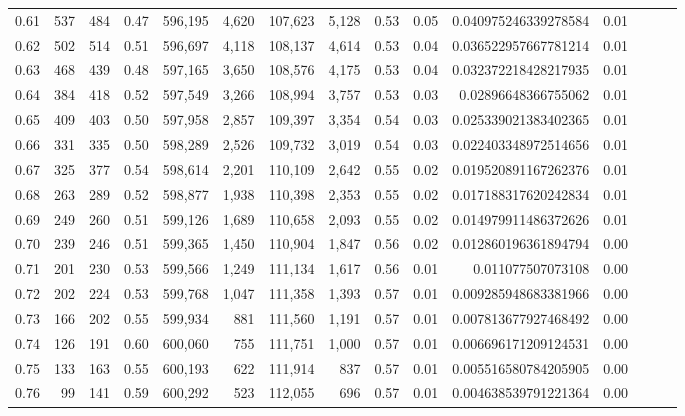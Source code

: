 \begin{tabular}{rrrrrrrrrrrrrrr}
0.61 &     537 &    484 &  0.47 &  596,195 &    4,620 &  107,623 &    5,128 &  0.53 &  0.05 &    0.040975246339278584 &      0.01 \\
0.62 &     502 &    514 &  0.51 &  596,697 &    4,118 &  108,137 &    4,614 &  0.53 &  0.04 &    0.036522957667781214 &      0.01 \\
0.63 &     468 &    439 &  0.48 &  597,165 &    3,650 &  108,576 &    4,175 &  0.53 &  0.04 &    0.032372218428217935 &      0.01 \\
0.64 &     384 &    418 &  0.52 &  597,549 &    3,266 &  108,994 &    3,757 &  0.53 &  0.03 &     0.02896648366755062 &      0.01 \\
0.65 &     409 &    403 &  0.50 &  597,958 &    2,857 &  109,397 &    3,354 &  0.54 &  0.03 &    0.025339021383402365 &      0.01 \\
0.66 &     331 &    335 &  0.50 &  598,289 &    2,526 &  109,732 &    3,019 &  0.54 &  0.03 &    0.022403348972514656 &      0.01 \\
0.67 &     325 &    377 &  0.54 &  598,614 &    2,201 &  110,109 &    2,642 &  0.55 &  0.02 &    0.019520891167262376 &      0.01 \\
0.68 &     263 &    289 &  0.52 &  598,877 &    1,938 &  110,398 &    2,353 &  0.55 &  0.02 &    0.017188317620242834 &      0.01 \\
0.69 &     249 &    260 &  0.51 &  599,126 &    1,689 &  110,658 &    2,093 &  0.55 &  0.02 &    0.014979911486372626 &      0.01 \\
0.70 &     239 &    246 &  0.51 &  599,365 &    1,450 &  110,904 &    1,847 &  0.56 &  0.02 &    0.012860196361894794 &      0.00 \\
0.71 &     201 &    230 &  0.53 &  599,566 &    1,249 &  111,134 &    1,617 &  0.56 &  0.01 &       0.011077507073108 &      0.00 \\
0.72 &     202 &    224 &  0.53 &  599,768 &    1,047 &  111,358 &    1,393 &  0.57 &  0.01 &    0.009285948683381966 &      0.00 \\
0.73 &     166 &    202 &  0.55 &  599,934 &      881 &  111,560 &    1,191 &  0.57 &  0.01 &    0.007813677927468492 &      0.00 \\
0.74 &     126 &    191 &  0.60 &  600,060 &      755 &  111,751 &    1,000 &  0.57 &  0.01 &    0.006696171209124531 &      0.00 \\
0.75 &     133 &    163 &  0.55 &  600,193 &      622 &  111,914 &      837 &  0.57 &  0.01 &    0.005516580784205905 &      0.00 \\
0.76 &      99 &    141 &  0.59 &  600,292 &      523 &  112,055 &      696 &  0.57 &  0.01 &    0.004638539791221364 &      0.00 \\

\end{tabular}
